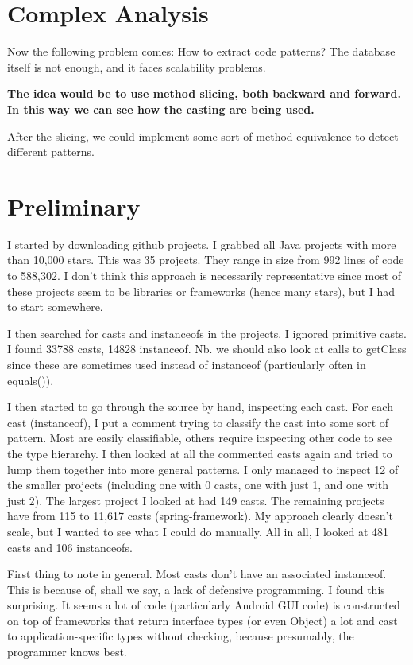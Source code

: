 \section{Complex Analysis}
\label{sec:org799c82c}

Now the following problem comes: How to extract code patterns? 
The database itself is not enough, and it faces scalability problems. 

\textbf{\textbf{The idea would be to use method slicing, both backward and forward. 
In this way we can see how the casting are being used.}} 

After the slicing, we could implement some sort of method equivalence to detect 
different patterns. 
\section{Preliminary}
\label{sec:org641dec0}

I started by downloading github projects. 
I grabbed all Java projects with more than 10,000 stars. 
This was 35 projects. 
They range in size from 992 lines of code to 588,302. 
I don't think this approach is necessarily representative since most of these projects seem to be libraries or frameworks (hence many stars), but I had to start somewhere. 

I then searched for casts and instanceofs in the projects. 
I ignored primitive casts. 
I found 33788 casts, 14828 instanceof. 
Nb. we should also look at calls to getClass since these are sometimes used instead of instanceof (particularly often in equals()). 

I then started to go through the source by hand, inspecting each cast. 
For each cast (instanceof), I put a comment trying to classify the cast into some sort of pattern. 
Most are easily classifiable, others require inspecting other code to see the type hierarchy. 
I then looked at all the commented casts again and tried to lump them together into more general patterns. 
I only managed to inspect 12 of the smaller projects (including one with 0 casts, one with just 1, and one with just 2). 
The largest project I looked at had 149 casts. 
The remaining projects have from 115 to 11,617 casts (spring-framework). 
My approach clearly doesn't scale, but I wanted to see what I could do manually. 
All in all, I looked at 481 casts and 106 instanceofs. 

First thing to note in general. 
Most casts don't have an associated instanceof. 
This is because of, shall we say, a lack of defensive programming. 
I found this surprising. 
It seems a lot of code (particularly Android GUI code) is constructed on top of frameworks that return interface types (or even Object) a lot and cast to application-specific types without checking, because presumably, the programmer knows best. 

